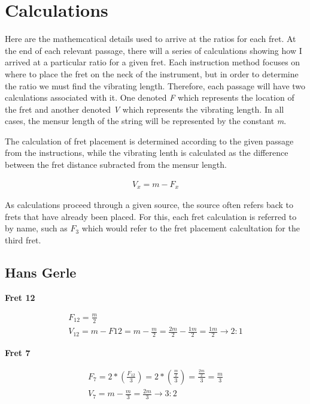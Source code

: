 \appendix
\chapter{Calculations}

Here are the mathemcatical details used to arrive at the ratios for each fret.  At the end of
each relevant passage, there will a series of calculations showing how I arrived at a particular
ratio for a given fret.  Each instruction method focuses on where to place the fret on the neck
of the instrument, but in order to determine the ratio we must find the vibrating length.
Therefore, each passage will have two calculations associated with it.  One denoted \textit{F}
which represents the location of the fret and another denoted \textit{V} which represents the
vibrating length.  In all cases, the mensur length of the string will be represented by the
constant \textit{m}.

The calculation of fret placement is determined according to the given passage from the
instructions, while the vibrating lenth is calculated as the difference between the fret distance
subracted from the mensur length.

\begin{eqnarray*}
    V_x = m - F_x
\end{eqnarray*}

As calculations proceed through a given source, the source often refers back to frets that have
already been placed.  For this, each fret calculation is referred to by name, such as
$F_{3}$ which would refer to the fret placement calcultation for the third fret.

\section{Hans Gerle}

\textbf{Fret 12}

\begin{eqnarray*}
F_{12} =
    \frac{m}{2} \\
V_{12} =
    m - F{12} =
    m - \frac{m}{2} =
    \frac{2m}{2} - \frac{1m}{2} =
    \frac{1m}{2}
    \to 2:1
\end{eqnarray*}

\textbf{Fret 7}

\begin{eqnarray*}
F_{7} =
    2 * ( \frac{F_{12}}{3} ) =
    2 * ( \frac{\frac{m}{2}}{3} ) =
    \frac{\frac{2m}{2}}{3} =
    \frac{m}{3} \\
    V_{7} = m - \frac{m}{3} = \frac{2m}{3} \to 3:2
\end{eqnarray*}

